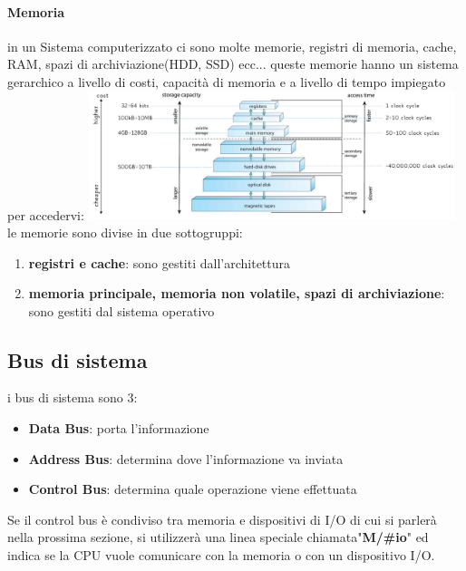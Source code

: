 \documentclass{article}
\begin{document}
    \paragraph{Memoria}
    in un Sistema computerizzato ci sono molte memorie, registri di memoria, cache, RAM, spazi di archiviazione(HDD, SSD) ecc... queste memorie hanno un sistema gerarchico a livello di costi, capacità di memoria e a livello di tempo impiegato per accedervi:
    {\centering \includegraphics[width=0.8\textwidth]{immagini/gerarchia memorie.png}}
    le memorie sono divise in due sottogruppi:
    \begin{enumerate}
        \item \textbf{registri e cache}: sono gestiti dall'architettura
        \item \textbf{memoria principale, memoria non volatile, spazi di archiviazione}: sono gestiti dal sistema operativo
    \end{enumerate}
    \subsection{Bus di sistema}
    i bus di sistema sono 3:
    \begin{itemize}
        \item \textbf{Data Bus}: porta l'informazione
        \item \textbf{Address Bus}: determina dove l'informazione va inviata
        \item \textbf{Control Bus}: determina quale operazione viene effettuata
    \end{itemize}
    Se il control bus è condiviso tra memoria e dispositivi di I/O di cui si parlerà nella prossima sezione, si utilizzerà una linea speciale chiamata"\textbf{M/\#io}" ed indica se la CPU vuole comunicare con la memoria o con un dispositivo I/O.
\end{document}
